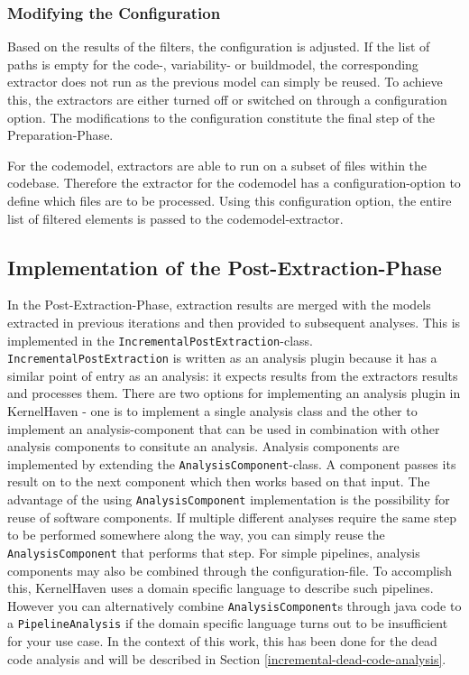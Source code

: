 \documentclass[a4paper]{article}
\begin{document}
\subsubsection{Modifying the Configuration}

Based on the results of the filters, the configuration is adjusted. If the list of paths is empty for the code-, variability- or buildmodel, the corresponding extractor does not run as the previous model can simply be reused. To achieve this, the extractors are either turned off or switched on through a configuration option. The modifications to the configuration constitute the final step of the Preparation-Phase.

For the codemodel, extractors are able to run on a subset of files within the codebase. Therefore the extractor for the codemodel has a configuration-option to define which files are to be processed. Using this configuration option, the entire list of filtered elements is passed to the codemodel-extractor.


\subsection{Implementation of the Post-Extraction-Phase}\label{post-extraction-phase}

In the Post-Extraction-Phase, extraction results are merged with the models extracted in previous iterations and then provided to subsequent analyses. This is implemented in the \texttt{IncrementalPostExtraction}-class. 
\texttt{IncrementalPostExtraction} is written as an analysis plugin because it has a similar point of entry as an analysis: it expects results from the extractors results and processes them. There are two options for implementing an analysis plugin in KernelHaven - one is to implement a single analysis class and the other to implement an analysis-component that can be used in combination with other analysis components to consitute an analysis. Analysis components are implemented by extending the \texttt{AnalysisComponent}-class. A component passes its result on to the next component which then works based on that input. The advantage of the using \texttt{AnalysisComponent} implementation is the possibility for reuse of software components. If multiple different analyses require the same step to be performed somewhere along the way, you can simply reuse the \texttt{AnalysisComponent} that performs that step. For simple pipelines, analysis components may also be combined through the configuration-file. To accomplish this, KernelHaven uses a domain specific language to describe such pipelines. However you can alternatively combine \texttt{AnalysisComponent}s through java code to a \texttt{PipelineAnalysis} if the domain specific language turns out to be insufficient for your use case. In the context of this work, this has been done for the dead code analysis and will be described in Section \ref{incremental-dead-code-analysis}.
\end{document}

